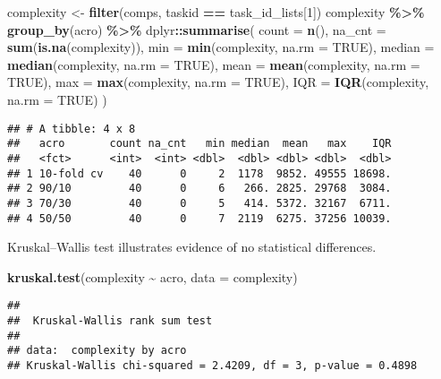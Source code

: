 \documentclass[
]{book}
\newenvironment{Shaded}{\begin{snugshade}}{\end{snugshade}}
\newcommand{\AttributeTok}[1]{\textcolor[rgb]{0.13,0.29,0.53}{#1}}
\newcommand{\ConstantTok}[1]{\textcolor[rgb]{0.56,0.35,0.01}{#1}}
\newcommand{\DecValTok}[1]{\textcolor[rgb]{0.00,0.00,0.81}{#1}}
\newcommand{\FunctionTok}[1]{\textcolor[rgb]{0.13,0.29,0.53}{\textbf{#1}}}
\newcommand{\NormalTok}[1]{#1}
\newcommand{\OtherTok}[1]{\textcolor[rgb]{0.56,0.35,0.01}{#1}}
\newcommand{\SpecialCharTok}[1]{\textcolor[rgb]{0.81,0.36,0.00}{\textbf{#1}}}
\begin{document}
\begin{Shaded}
\begin{Highlighting}[]
\NormalTok{complexity }\OtherTok{\textless{}{-}} \FunctionTok{filter}\NormalTok{(comps, taskid }\SpecialCharTok{==}\NormalTok{ task\_id\_lists[}\DecValTok{1}\NormalTok{])}
\NormalTok{complexity }\SpecialCharTok{\%\textgreater{}\%}
  \FunctionTok{group\_by}\NormalTok{(acro) }\SpecialCharTok{\%\textgreater{}\%}
\NormalTok{  dplyr}\SpecialCharTok{::}\FunctionTok{summarise}\NormalTok{(}
    \AttributeTok{count =} \FunctionTok{n}\NormalTok{(),}
    \AttributeTok{na\_cnt =} \FunctionTok{sum}\NormalTok{(}\FunctionTok{is.na}\NormalTok{(complexity)),}
    \AttributeTok{min =} \FunctionTok{min}\NormalTok{(complexity, }\AttributeTok{na.rm =} \ConstantTok{TRUE}\NormalTok{),}
    \AttributeTok{median =} \FunctionTok{median}\NormalTok{(complexity, }\AttributeTok{na.rm =} \ConstantTok{TRUE}\NormalTok{),}
    \AttributeTok{mean =} \FunctionTok{mean}\NormalTok{(complexity, }\AttributeTok{na.rm =} \ConstantTok{TRUE}\NormalTok{),}
    \AttributeTok{max =} \FunctionTok{max}\NormalTok{(complexity, }\AttributeTok{na.rm =} \ConstantTok{TRUE}\NormalTok{),}
    \AttributeTok{IQR =} \FunctionTok{IQR}\NormalTok{(complexity, }\AttributeTok{na.rm =} \ConstantTok{TRUE}\NormalTok{)}
\NormalTok{  )}
\end{Highlighting}
\end{Shaded}

\begin{verbatim}
## # A tibble: 4 x 8
##   acro       count na_cnt   min median  mean   max    IQR
##   <fct>      <int>  <int> <dbl>  <dbl> <dbl> <dbl>  <dbl>
## 1 10-fold cv    40      0     2  1178  9852. 49555 18698.
## 2 90/10         40      0     6   266. 2825. 29768  3084.
## 3 70/30         40      0     5   414. 5372. 32167  6711.
## 4 50/50         40      0     7  2119  6275. 37256 10039.
\end{verbatim}

Kruskal--Wallis test illustrates evidence of no statistical differences.

\begin{Shaded}
\begin{Highlighting}[]
\FunctionTok{kruskal.test}\NormalTok{(complexity }\SpecialCharTok{\textasciitilde{}}\NormalTok{ acro, }\AttributeTok{data =}\NormalTok{ complexity)}
\end{Highlighting}
\end{Shaded}

\begin{verbatim}
## 
##  Kruskal-Wallis rank sum test
## 
## data:  complexity by acro
## Kruskal-Wallis chi-squared = 2.4209, df = 3, p-value = 0.4898
\end{verbatim}
\end{document}
